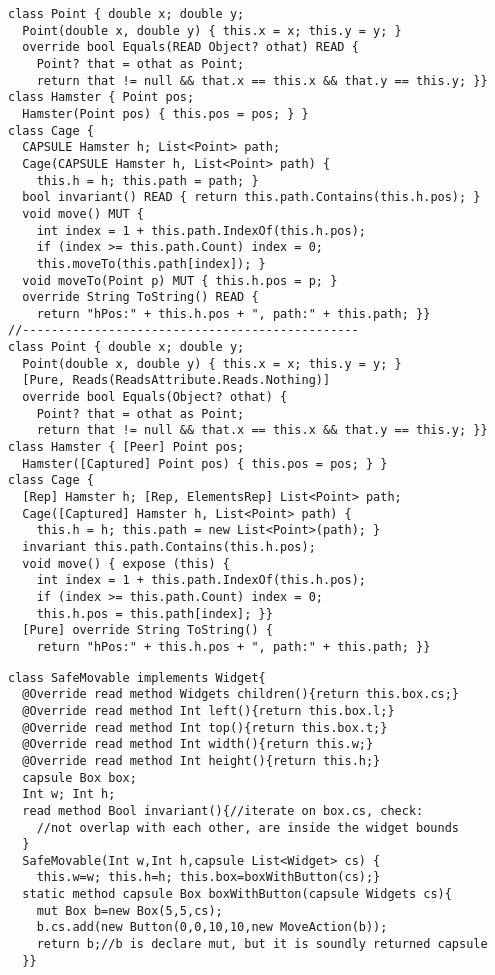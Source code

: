 \begin{lstlisting}
class Point { double x; double y;
  Point(double x, double y) { this.x = x; this.y = y; }
  override bool Equals(READ Object? othat) READ {
    Point? that = othat as Point;
    return that != null && that.x == this.x && that.y == this.y; }}
class Hamster { Point pos;
  Hamster(Point pos) { this.pos = pos; } }
class Cage {
  CAPSULE Hamster h; List<Point> path;
  Cage(CAPSULE Hamster h, List<Point> path) {
    this.h = h; this.path = path; }
  bool invariant() READ { return this.path.Contains(this.h.pos); }
  void move() MUT {
    int index = 1 + this.path.IndexOf(this.h.pos);
    if (index >= this.path.Count) index = 0;
    this.moveTo(this.path[index]); }
  void moveTo(Point p) MUT { this.h.pos = p; }
  override String ToString() READ {
    return "hPos:" + this.h.pos + ", path:" + this.path; }}
//-----------------------------------------------
class Point { double x; double y;
  Point(double x, double y) { this.x = x; this.y = y; }
  [Pure, Reads(ReadsAttribute.Reads.Nothing)]
  override bool Equals(Object? othat) {
    Point? that = othat as Point;
    return that != null && that.x == this.x && that.y == this.y; }}
class Hamster { [Peer] Point pos;
  Hamster([Captured] Point pos) { this.pos = pos; } }
class Cage {
  [Rep] Hamster h; [Rep, ElementsRep] List<Point> path;
  Cage([Captured] Hamster h, List<Point> path) {
    this.h = h; this.path = new List<Point>(path); }
  invariant this.path.Contains(this.h.pos);
  void move() { expose (this) {
    int index = 1 + this.path.IndexOf(this.h.pos);
    if (index >= this.path.Count) index = 0;
    this.h.pos = this.path[index]; }}
  [Pure] override String ToString() {
    return "hPos:" + this.h.pos + ", path:" + this.path; }}
\end{lstlisting}
\newpage
\begin{lstlisting}
class SafeMovable implements Widget{
  @Override read method Widgets children(){return this.box.cs;}
  @Override read method Int left(){return this.box.l;}
  @Override read method Int top(){return this.box.t;}
  @Override read method Int width(){return this.w;}
  @Override read method Int height(){return this.h;}
  capsule Box box;
  Int w; Int h;
  read method Bool invariant(){//iterate on box.cs, check:
    //not overlap with each other, are inside the widget bounds
  }
  SafeMovable(Int w,Int h,capsule List<Widget> cs) {
    this.w=w; this.h=h; this.box=boxWithButton(cs);}
  static method capsule Box boxWithButton(capsule Widgets cs){
    mut Box b=new Box(5,5,cs);
    b.cs.add(new Button(0,0,10,10,new MoveAction(b));
    return b;//b is declare mut, but it is soundly returned capsule
  }}
\end{lstlisting}

